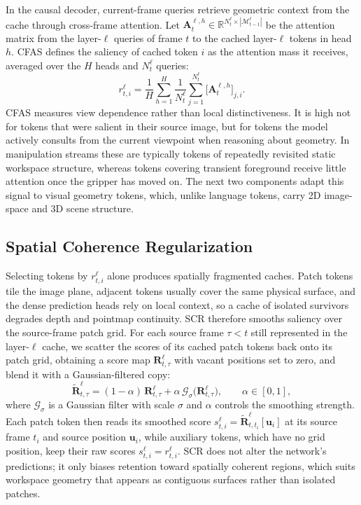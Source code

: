 In the causal decoder, current-frame queries retrieve geometric context from the cache through cross-frame attention. Let $\mathbf{A}^{\ell,h}_{t}\in\mathbb{R}^{N_t^{\ell}\times|\mathcal{M}^{\ell}_{t-1}|}$ be the attention matrix from the layer-$\ell$ queries of frame $t$ to the cached layer-$\ell$ tokens in head $h$. CFAS defines the saliency of cached token $i$ as the attention mass it receives, averaged over the $H$ heads and $N_t^{\ell}$ queries:
\begin{equation}
r^{\ell}_{t,i}
= \frac{1}{H}\sum_{h=1}^{H}\frac{1}{N_t^{\ell}}
\sum_{j=1}^{N_t^{\ell}}
\bigl[\mathbf{A}^{\ell,h}_{t}\bigr]_{j,i}.
\label{eq:cfas}
\end{equation}
CFAS measures view dependence rather than local distinctiveness. It is high not for tokens that were salient in their source image, but for tokens the model actively consults from the current viewpoint when reasoning about geometry. In manipulation streams these are typically tokens of repeatedly revisited static workspace structure, whereas tokens covering transient foreground receive little attention once the gripper has moved on. The next two components adapt this signal to visual geometry tokens, which, unlike language tokens, carry 2D image-space and 3D scene structure.

\subsection{Spatial Coherence Regularization}
\label{sec:scr}

Selecting tokens by $r^{\ell}_{t,i}$ alone produces spatially fragmented caches. Patch tokens tile the image plane, adjacent tokens usually cover the same physical surface, and the dense prediction heads rely on local context, so a cache of isolated survivors degrades depth and pointmap continuity. SCR therefore smooths saliency over the source-frame patch grid. For each source frame $\tau<t$ still represented in the layer-$\ell$ cache, we scatter the scores of its cached patch tokens back onto its patch grid, obtaining a score map $\mathbf{R}^{\ell}_{t,\tau}$ with vacant positions set to zero, and blend it with a Gaussian-filtered copy:
\begin{equation}
\widetilde{\mathbf{R}}^{\ell}_{t,\tau}
= (1-\alpha)\,\mathbf{R}^{\ell}_{t,\tau}
+ \alpha\,\mathcal{G}_{\sigma}\bigl(\mathbf{R}^{\ell}_{t,\tau}\bigr),
\qquad \alpha\in[0,1],
\label{eq:scr_blend}
\end{equation}
where $\mathcal{G}_{\sigma}$ is a Gaussian filter with scale $\sigma$ and $\alpha$ controls the smoothing strength. Each patch token then reads its smoothed score $s^{\ell}_{t,i}=\widetilde{\mathbf{R}}^{\ell}_{t,t_i}[\mathbf{u}_i]$ at its source frame $t_i$ and source position $\mathbf{u}_i$, while auxiliary tokens, which have no grid position, keep their raw scores $s^{\ell}_{t,i}=r^{\ell}_{t,i}$. SCR does not alter the network's predictions; it only biases retention toward spatially coherent regions, which suits workspace geometry that appears as contiguous surfaces rather than isolated patches.

